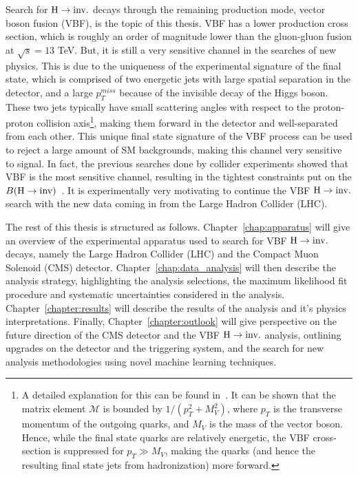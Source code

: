 Search for $\textrm{H} \rightarrow \textrm{inv.}$ decays through the remaining production mode, vector boson fusion (VBF), is the topic of this thesis.
VBF has a lower production cross section, which is roughly an order of magnitude lower than the gluon-gluon fusion at $\sqrt{s} = 13$ TeV. But, it is still
a very sensitive channel in the searches of new physics. This is due to the uniqueness of the experimental signature of the final state, which is comprised of two energetic jets with large
spatial separation in the detector, and a large $p_T^{miss}$ because of the invisible decay of the Higgs boson. These two jets typically have small scattering angles with respect to the proton-proton
collision axis\footnote{A detailed explanation for this can be found in~\cite{Djouadi:2005gi}. It can be shown that the matrix element $\mathcal{M}$ is bounded by $1 / (p_T^2 + M_V^2)$,
where $p_T$ is the transverse momentum of the outgoing quarks, and $M_V$ is the mass of the vector boson. Hence, while the final state quarks are relatively energetic, the VBF cross-section is
suppressed for $p_{T} \gg M_{V}$, making the quarks (and hence the resulting final state jets from hadronization) more forward.}, 
making them forward in the detector and well-separated from each other. This unique final state signature of the VBF process can be used to reject a large amount of
SM backgrounds, making this channel very sensitive to signal. In fact, the previous searches done by collider experiments showed that VBF is the most sensitive channel, resulting
in the tightest constraints put on the ${B(\textrm{H}\rightarrow\text{inv})}$~\cite{CMS:2018yfx}. It is experimentally very motivating to continue the VBF $\textrm{H} \rightarrow \textrm{inv.}$ search with the new data coming in from
the Large Hadron Collider (LHC).

The rest of this thesis is structured as follows. Chapter~\ref{chap:apparatus} will give an overview of the experimental apparatus used to search for VBF $\textrm{H} \rightarrow \textrm{inv.}$ decays, namely the Large
Hadron Collider (LHC) and the Compact Muon Solenoid (CMS) detector. Chapter~\ref{chap:data_analysis} will then describe the analysis strategy, highlighting the analysis selections, the maximum
likelihood fit procedure and systematic uncertainties considered in the analysis. Chapter~\ref{chapter:results} will describe the results of the analysis and it's physics interpretations. Finally,
Chapter~\ref{chapter:outlook} will give perspective on the future direction of the CMS detector and the VBF $\textrm{H} \rightarrow \textrm{inv.}$ analysis, outlining upgrades on the detector and the triggering system, and
the search for new analysis methodologies using novel machine learning techniques.